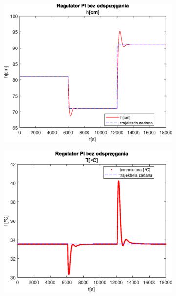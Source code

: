 \begin{figure}[h!]
   \centering
   \begin{subfigure}[b]{0.4\textwidth}
      \includegraphics[width=1\linewidth]{img/PI/noDecoupler/noDisturbance/PINoDecouplerH2Lintrue.eps}
      \caption{}
      \label{fig:fig:PINodDecoupler2Lintrue1}
   \end{subfigure}
       
   \begin{subfigure}[b]{0.4\textwidth}
      \includegraphics[width=1\linewidth]{img/PI/noDecoupler/noDisturbance/PINoDecouplerT2Lintrue.eps}
      \caption{}
      \label{fig:fig:PINodDecoupler2Lintrue2}
   \end{subfigure}
       

\end{figure}
